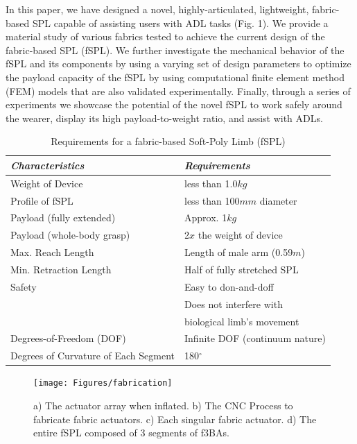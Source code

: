 \documentclass[letterpaper, 10 pt, conference]{ieeeconf}  %
\begin{document}
In this paper, we have designed a novel, highly-articulated, lightweight, fabric-based SPL capable of assisting users with ADL tasks (Fig. 1). We provide a material study of various fabrics tested to achieve the current design of the fabric-based SPL (fSPL). We further investigate the mechanical behavior of the fSPL and its components by using a varying set of design parameters to optimize the payload capacity of the fSPL by using computational finite element method (FEM) models that are also validated experimentally. Finally, through a series of experiments we showcase the potential of the novel fSPL to work safely around the wearer, display its high payload-to-weight ratio, and assist with ADLs. 

\label{sec:func_req}
\begin{table}[t!]
\caption{Requirements for a fabric-based Soft-Poly Limb (fSPL)} 
\label{tab:spec_table}
	\begin{tabularx}{0.48\textwidth}{*2l}    \toprule\toprule
	\textbf{\emph{Characteristics}} & \textbf{\emph{Requirements}} \\\midrule
	Weight of Device    & less than 1.0$kg$  \\ 
	Profile of fSPL & less than 100$mm$ diameter \\ 
	Payload (fully extended)    & Approx. 1$kg$  \\ 
	Payload (whole-body grasp) & 2$x$ the weight of device \\ 
	Max. Reach Length    & Length of male arm (0.59$m$)  \\ 
	Min. Retraction Length & Half of fully stretched SPL \\ 
	Safety    & Easy to don-and-doff \\ 
	 &Does not interfere with\\
     &biological limb's movement\\
	Degrees-of-Freedom (DOF) & Infinite DOF (continuum nature) \\ 
	Degrees of Curvature of Each Segment & 180$^{\circ}$ \\\bottomrule
	 \hline
	\end{tabularx}
    \vspace{-5mm}
\end{table}


\begin{figure}[!hb]
\vspace*{-0.5cm}
\centering
\texttt{[image: Figures/fabrication]}
\caption{a) The actuator array when inflated. b) The CNC Process to fabricate fabric actuators. c) Each singular fabric actuator. d) The entire fSPL composed of 3 segments of f3BAs.}
\label{fig:fabrication}
\end{figure}
\end{document}
